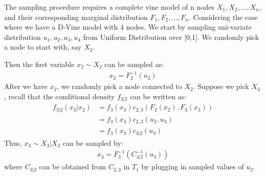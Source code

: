 \documentclass{article}
\begin{document}




	The sampling procedure requires a complete vine model of n nodes $X_1,X_2,...,X_n$, and their corresponding marginal distribution $F_1,F_2,...,F_n$.
Considering the case where we have a D-Vine model with 4 nodes. We start by sampling uni-variate distribution $u_1,u_2,u_3,u_4$ from Uniform Distribution over [0,1]. We randomly pick a node to start with, say $X_2$.

Then the first variable $x_2 \sim X_2$ can be sampled as:
\begin{align}
x_2 = F_2^{-1}(u_2)
\end{align}
After we have $x_2$, we randomly pick a node connected to $X_2$. Suppose we pick $X_3$, recall that the conditional density $f_{3|2}$ can be written as:
\begin{align}
f_{3|2}(x_3|x_2)&=f_3(x_3)c_{2,3}(F_2(x_2),F_3(x_3)) \\
&=f_3(x_3)c_{2,3}(u_2,u_3) \\
&=f_3(x_3)c_{3|2}(u_3)
\end{align}
Thus, $x_3 \sim X_3|X_2$ can be sampled by:
\begin{align}
x_3 = F_3^{-1}(C_{3|2}^{-1}(u_3))
\end{align}
where $C_{3|2}$ can be obtained from $C_{2,3}$ in $T_1$ by plugging in sampled values of $u_2$. 
\end{document}
